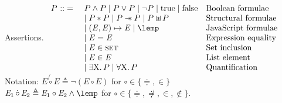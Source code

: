 \documentclass{article}
\begin{document}
\begin{display}{Assertions.}
$\begin{array}{rll}
  P \defeq 
 & P \land P \pipe P \lor P \pipe \neg P \pipe \true \pipe \false & \text{Boolean formulae}\\
 & \pipe P \sep P \pipe P \wand P \pipe P \sepish P %
                         & \text{Structural formulae} \\
 & \pipe (\Expr,\Expr)\pointsto \Expr \pipe \lemp %
                         & \text{JavaScript formulae} \\
 & \pipe \Expr\doteqdot\Expr & \text{Expression equality} \\ %
 & \pipe \Expr \in \T{set} & \text{Set inclusion} \\
 & \pipe \Expr \elem \Expr  & \text{List element} \\
 & \pipe \exists\V{X}\st P  \pipe \forall\V{X}\st P &  \text{Quantification} \\
\end{array}\Gap$\\[\gap]
Notation: $E\not{\!\circ} E \triangleq \neg(E \circ E)$  for ${\circ}\in\{\doteqdot,\in\}$\\
\phantom{Notation: }$\Expr_1 \dot{\,\circ\,}\Expr_2 \triangleq \Expr_1 \circ \Expr_2 \land \lemp$ for ${\circ}\in\{\doteqdot,\not\doteqdot,\in,\notin\}$.
\end{display}
%
\newpage
\end{document}
